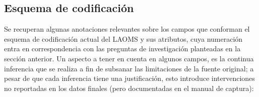 \documentclass[letterpaper, 11pt]{book}
\theoremstyle{definition}
\theoremstyle{remark}
\begin{document}
\subsection{Esquema de codificación}
\label{sec:Esquema_codificacion_LAOMS}

Se recuperan algunas anotaciones relevantes sobre los campos que conforman el esquema de codificación actual del LAOMS y sus atributos, cuya numeración entra en correspondencia con las preguntas de investigación planteadas en la sección anterior. 
Un aspecto a tener en cuenta en algunos campos, es la continua inferencia que se realiza a fin de subsanar las limitaciones de la fuente original; a pesar de que cada inferencia tiene una justificación, esto introduce intervenciones no reportadas en los datos finales (pero documentadas en el manual de captura):
\end{document}
